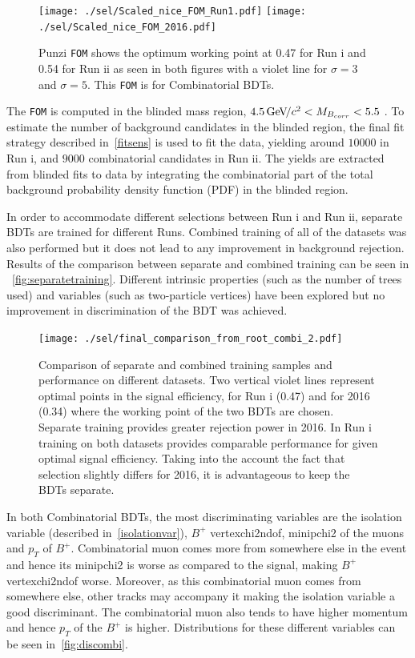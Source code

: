 \begin{figure}[ht]
\centering
	\texttt{[image: ./sel/Scaled\_nice\_FOM\_Run1.pdf]}%
	\texttt{[image: ./sel/Scaled\_nice\_FOM\_2016.pdf]}%
	\caption{ Punzi \texttt{FOM} shows the optimum working point at 0.47 for Run \Rn{1} and 0.54 for Run \Rn{2} as seen in both figures with a violet line for $\sigma=3$ and $\sigma=5$. This \texttt{FOM} is for Combinatorial BDTs.}
\label{fig:punzifom}
\end{figure}


The \texttt{FOM} is computed in the blinded mass region, $4.5{\mathrm{\,Ge\kern -0.1em V\!/}c^2} <M_{B_{corr}} <5.5$ \gevcc. To estimate the number of background candidates in the blinded region, the final fit strategy described in~\autoref{fitsens} is used to fit the data, yielding around $10000$ in Run \Rn{1}, and $9000$ combinatorial candidates in Run \Rn{2}. The yields are extracted from blinded fits to data by integrating the combinatorial part of the total background probability density function (PDF) in the blinded region.

In order to accommodate different selections between Run \Rn{1} and Run \Rn{2}, separate BDTs are trained for different Runs. Combined training of all of the datasets was also performed but it does not lead to any improvement in background rejection. Results of the comparison between separate and combined training can be seen in ~\autoref{fig:separatetraining}. Different intrinsic properties (such as the number of trees used) and variables (such as two-particle vertices) have been explored but no improvement in discrimination of the BDT was achieved.


\begin{figure}[ht]
\centering
\texttt{[image: ./sel/final\_comparison\_from\_root\_combi\_2.pdf]}
	\caption{Comparison of separate and combined training samples and performance on different datasets. Two vertical violet lines represent optimal points in the signal efficiency, for Run \Rn{1} (0.47) and for 2016 (0.34) where the working point of the two BDTs are chosen. Separate training provides greater rejection power in 2016. In Run \Rn{1} training on both datasets provides comparable performance for given optimal signal efficiency. Taking into the account the fact that selection slightly differs for 2016, it is advantageous to keep the BDTs separate.}
\label{fig:separatetraining}
\end{figure}




In both Combinatorial BDTs, the most discriminating variables are the isolation variable (described in~\autoref{isolationvar}), $B^{+}$ \gls{vertexchi2ndof}, \gls{minipchi2} of the muons and $p_{T}$ of $B^{+}$. Combinatorial muon comes more from somewhere else in the event and hence its \gls{minipchi2} is worse as compared to the signal, making $B^{+}$ \gls{vertexchi2ndof} worse. Moreover, as this combinatorial muon comes from somewhere else, other tracks may accompany it making the isolation variable a good discriminant. The combinatorial muon also tends to have higher momentum and hence $p_{T}$ of the $B^{+}$ is higher. Distributions for these different variables can be seen in~\autoref{fig:discombi}. 



